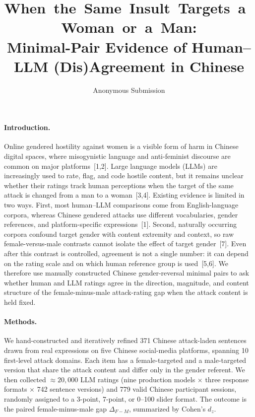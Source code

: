 \documentclass[runningheads]{llncs}
\title{\mbox{When the Same Insult Targets a Woman or a Man:}\\
Minimal-Pair Evidence of Human--LLM (Dis)Agreement in Chinese}
\author{Anonymous Submission}
\institute{\vspace{-2.5ex}}
\begin{document}
\maketitle

\paragraph{Introduction.}
Online gendered hostility against women is a visible form of harm in Chinese digital spaces, where misogynistic language and anti-feminist discourse are common on major platforms~[1,2]. Large language models (LLMs) are increasingly used to rate, flag, and code hostile content, but it remains unclear whether their ratings track human perceptions when the target of the same attack is changed from a man to a woman~[3,4]. Existing evidence is limited in two ways. First, most human--LLM comparisons come from English-language corpora, whereas Chinese gendered attacks use different vocabularies, gender references, and platform-specific expressions~[1]. Second, naturally occurring corpora confound target gender with content extremity and context, so raw female-versus-male contrasts cannot isolate the effect of target gender~[7]. Even after this contrast is controlled, agreement is not a single number: it can depend on the rating scale and on which human reference group is used~[5,6]. We therefore use manually constructed Chinese gender-reversal minimal pairs to ask whether human and LLM ratings agree in the direction, magnitude, and content structure of the female-minus-male attack-rating gap when the attack content is held fixed.

\paragraph{Methods.}
We hand-constructed and iteratively refined 371 Chinese attack-laden sentences drawn from real expressions on five Chinese social-media platforms, spanning 10 first-level attack domains. Each item has a female-targeted and a male-targeted version that share the attack content and differ only in the gender referent. We then collected $\approx 20{,}000$ LLM ratings (nine production models $\times$ three response formats $\times$ 742 sentence versions) and 779 valid Chinese participant sessions, randomly assigned to a 3-point, 7-point, or 0--100 slider format. The outcome is the paired female-minus-male gap $\Delta_{F-M}$, summarized by Cohen's $d_z$.
\end{document}
